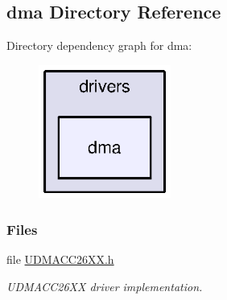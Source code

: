 \subsection{dma Directory Reference}
\label{dir_21a0c9d486943857364a519c7b91d02a}
Directory dependency graph for dma\+:
\nopagebreak
\begin{figure}[H]
\begin{center}
\leavevmode
\includegraphics[width=123pt]{dir_21a0c9d486943857364a519c7b91d02a_dep}
\end{center}
\end{figure}
\subsubsection*{Files}
\begin{DoxyCompactItemize}
\item 
file \hyperlink{_u_d_m_a_c_c26_x_x_8h}{U\+D\+M\+A\+C\+C26\+X\+X.\+h}
\begin{DoxyCompactList}\small\item\em U\+D\+M\+A\+C\+C26\+X\+X driver implementation. \end{DoxyCompactList}\end{DoxyCompactItemize}
